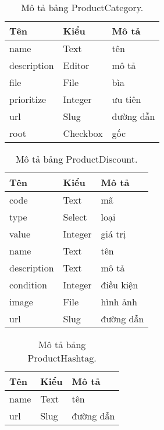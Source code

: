 \begin{table}[h!]
\begin{center}
	\caption{Mô tả bảng ProductCategory.}
	\begin{tabular}{ |l|l|l| } 
	\hline
	Tên & Kiểu & Mô tả \\
	\hline
	name & Text & tên \\
description & Editor & mô tả \\
file & File & bìa \\
prioritize & Integer & ưu tiên \\
url & Slug & đường dẫn \\
root & Checkbox & gốc \\
	\hline
\end{tabular}
	\label{table:ProductCategory}
\end{center}
\end{table}


\begin{table}[h!]
\begin{center}
	\caption{Mô tả bảng ProductDiscount.}
	\begin{tabular}{ |l|l|l| } 
	\hline
	Tên & Kiểu & Mô tả \\
	\hline
	code & Text & mã \\
type & Select & loại \\
value & Integer & giá trị \\
name & Text & tên \\
description & Text & mô tả \\
condition & Integer & điều kiện \\
image & File & hình ảnh \\
url & Slug & đường dẫn \\
	\hline
\end{tabular}
	\label{table:ProductDiscount}
\end{center}
\end{table}


\begin{table}[h!]
\begin{center}
	\caption{Mô tả bảng ProductHashtag.}
	\begin{tabular}{ |l|l|l| } 
	\hline
	Tên & Kiểu & Mô tả \\
	\hline
	name & Text & tên \\
url & Slug & đường dẫn \\
	\hline
\end{tabular}
	\label{table:ProductHashtag}
\end{center}
\end{table}


